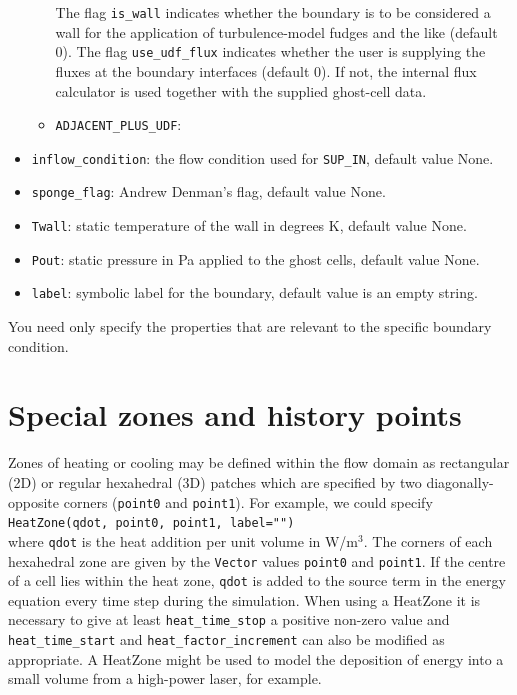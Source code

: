 \documentclass[12pt,a4paper,twoside]{article}
\begin{document}
\begin{itemize}
\begin{itemize}
        The flag \texttt{is\_wall} indicates whether the boundary is to be considered
        a wall for the application of turbulence-model fudges and the like (default 0).
        The flag \texttt{use\_udf\_flux} indicates whether the user is supplying
        the fluxes at the boundary interfaces (default 0).  
        If not, the internal flux calculator is used together with the supplied ghost-cell data.
      \item \texttt{ADJACENT\_PLUS\_UDF}:
    \end{itemize}
  \item \texttt{inflow\_condition}: the flow condition used for
    \texttt{SUP\_IN}, default value None.
  \item \texttt{sponge\_flag}: Andrew Denman's flag, default value None.
  \item \texttt{Twall}: static temperature of the wall in degrees K, default value None.
  \item \texttt{Pout}: static pressure in Pa applied to the ghost cells, default value None.
  \item \texttt{label}: symbolic label for the boundary, default value is an empty string.
\end{itemize}
You need only specify the properties that are relevant to the specific
boundary condition.

\bigskip
\section{Special zones and history points}
\label{sec:special-zones}
% 
Zones of heating or cooling may be defined within the flow domain as rectangular (2D) 
or regular hexahedral (3D) patches which are specified by two diagonally-opposite
corners (\texttt{point0} and \texttt{point1}).
For example, we could specify\\
\texttt{HeatZone(qdot, point0, point1, label="")}\\
where \texttt{qdot} is the heat addition per unit volume in W/m$^3$.
The corners of each hexahedral zone are given by the \texttt{Vector} values 
\texttt{point0} and \texttt{point1}.
If the centre of a cell lies within the heat zone, \texttt{qdot} is added to
the source term in the energy equation every time step during the simulation. When using
a HeatZone it is necessary to give at least \texttt{heat\_time\_stop} a positive non-zero
value and \texttt{heat\_time\_start} and \texttt{heat\_factor\_increment} can also be modified
as appropriate.
A HeatZone might be used to model the deposition of energy into a small volume from 
a high-power laser, for example.
\end{document}
